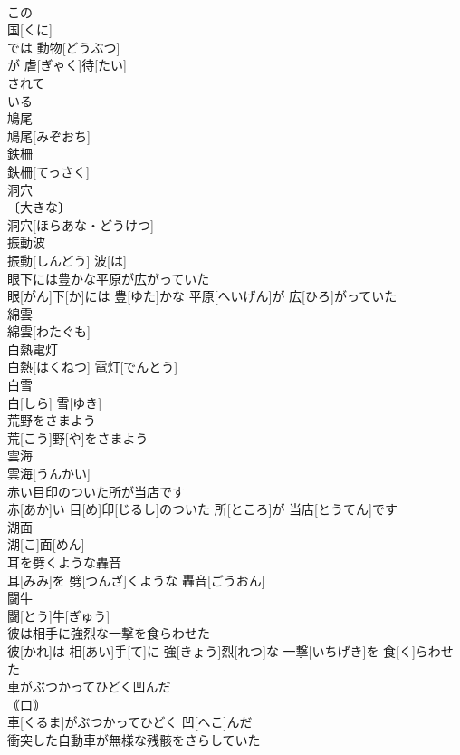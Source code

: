 \documentclass[8pt]{extreport}
\begin{document}
\begin{CJK}{UTF8}{min}
\\	この 
\\	国[くに]
\\	では 動物[どうぶつ]
\\	が 虐[ぎゃく]待[たい]
\\	されて 
\\	いる 
\\	鳩尾	
\\	鳩尾[みぞおち]
\\	鉄柵	
\\	鉄柵[てっさく]
\\	洞穴	
\\	〔大きな〕
\\	洞穴[ほらあな・どうけつ] 
\\	振動波	
\\	振動[しんどう] 波[は]
\\	眼下には豊かな平原が広がっていた	
\\	眼[がん]下[か]には 豊[ゆた]かな 平原[へいげん]が 広[ひろ]がっていた
\\	綿雲	
\\	綿雲[わたぐも]
\\	白熱電灯	
\\	白熱[はくねつ] 電灯[でんとう]
\\	白雪	
\\	白[しら] 雪[ゆき]
\\	荒野をさまよう	
\\	荒[こう]野[や]をさまよう
\\	雲海	
\\	雲海[うんかい]
\\	赤い目印のついた所が当店です	
\\	赤[あか]い 目[め]印[じるし]のついた 所[ところ]が 当店[とうてん]です
\\	湖面	
\\	湖[こ]面[めん]
\\	耳を劈くような轟音	
\\	耳[みみ]を 劈[つんざ]くような 轟音[ごうおん]
\\	闘牛	
\\	闘[とう]牛[ぎゅう]
\\	彼は相手に強烈な一撃を食らわせた	
\\	彼[かれ]は 相[あい]手[て]に 強[きょう]烈[れつ]な 一撃[いちげき]を 食[く]らわせた
\\	車がぶつかってひどく凹んだ	
\\	｟口｠ 
\\	車[くるま]がぶつかってひどく 凹[へこ]んだ
\\	衝突した自動車が無様な残骸をさらしていた	

\end{CJK}
\end{document}
